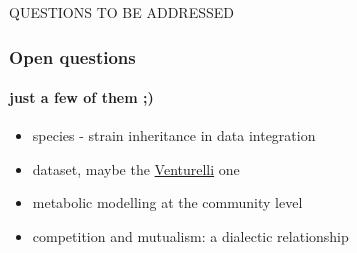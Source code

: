 \documentclass{beamer}
\begin{document}
   QUESTIONS TO BE ADDRESSED 
   \begin{frame}
      \frametitle{Open questions}
      \framesubtitle{just a few of them ;)  }

      \begin{itemize}
         
         \item species - strain inheritance in data integration
         \item dataset, maybe the \href{https://www.embopress.org/doi/full/10.15252/msb.20178157}{Venturelli} one 
         \item metabolic modelling at the community level
         \item competition and mutualism: a dialectic relationship
         
      \end{itemize}

   \end{frame}

   \fi


\end{document}
